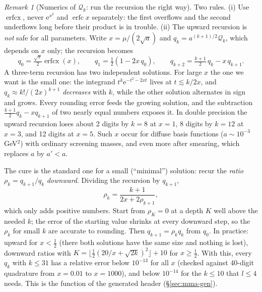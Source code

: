 \documentclass[11pt,a4paper]{article}
\numberwithin{equation}{section}
\theoremstyle{definition}
\theoremstyle{plain}
\theoremstyle{remark}
\newtheorem{remark}[definition]{Remark}
\numberwithin{algorithm}{section}
\newcommand{\ee}{\mathrm{e}}
\newcommand{\erfc}{\operatorname{erfc}}
\newcommand{\erfcx}{\operatorname{erfcx}}
\begin{document}
\begin{remark}[Numerics of $\mathcal Q_k$: run the recursion the right way]
Two rules. (i) Use $\erfcx$, never $\ee^{x^2}$ and $\erfc x$ separately: the first overflows and the second underflows long before their product is in trouble. (ii) The upward recursion is \emph{not} safe for all parameters. Write $x=\mu/(2\sqrt a)$ and $q_k=a^{(k+1)/2}\mathcal Q_k$, which depends on $x$ only; the recursion becomes
\[
q_0=\tfrac{\sqrt\pi}{2}\erfcx(x),\qquad q_1=\tfrac12(1-2x\,q_0),\qquad q_{k+2}=\tfrac{k+1}2\,q_k-x\,q_{k+1}.
\]
A three-term recursion has two independent solutions. For large $x$ the one we want is the small one: the integrand $t^k\ee^{-t^2-2xt}$ lives at $t\lesssim k/2x$, and $q_k\approx k!/(2x)^{k+1}$ \emph{decreases} with $k$, while the other solution alternates in sign and grows. Every rounding error feeds the growing solution, and the subtraction $\frac{k+1}2q_k-xq_{k+1}$ of two nearly equal numbers exposes it. In double precision the upward recursion loses about 2 digits by $k=8$ at $x=1$, 8 digits by $k=12$ at $x=3$, and 12 digits at $x=5$. Such $x$ occur for diffuse basis functions ($a\sim10^{-3}\,$GeV$^2$) with ordinary screening masses, and even more after smearing, which replaces $a$ by $a'<a$.

The cure is the standard one for a small (``minimal'') solution: recur the \emph{ratio} $\rho_k=q_{k+1}/q_k$ \emph{downward}. Dividing the recursion by $q_{k+1}$,
\[
\rho_k=\frac{k+1}{2x+2\rho_{k+1}},
\]
which only adds positive numbers. Start from $\rho_K=0$ at a depth $K$ well above the needed $k$; the error of the starting value shrinks at every downward step, so the $\rho_k$ for small $k$ are accurate to rounding. Then $q_{k+1}=\rho_kq_k$ from $q_0$. In practice: upward for $x<\frac12$ (there both solutions have the same size and nothing is lost), downward ratios with $K=\lfloor\frac12(20/x+\sqrt{2k})^2\rfloor+10$ for $x\ge\frac12$. With this, every $q_k$ with $k\le 31$ has a relative error below $10^{-13}$ for all $x$ (checked against 40-digit quadrature from $x=0.01$ to $x=1000$), and below $10^{-14}$ for the $k\le10$ that $l\le4$ needs. This is the function  of the generated header (\S\ref{sec:mma-gen}).
\end{remark}
\end{document}
